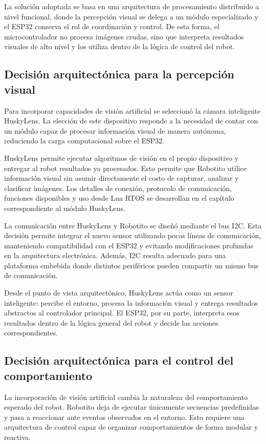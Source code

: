 \documentclass{prgrado}
\begin{document}
La solución adoptada se basa en una arquitectura de procesamiento distribuido a nivel funcional, donde la percepción visual se delega a un módulo especializado y el ESP32 conserva el rol de coordinación y control. De esta forma, el microcontrolador no procesa imágenes crudas, sino que interpreta resultados visuales de alto nivel y los utiliza dentro de la lógica de control del robot.

\subsection{Decisión arquitectónica para la percepción visual}

Para incorporar capacidades de visión artificial se seleccionó la cámara inteligente HuskyLens. La elección de este dispositivo responde a la necesidad de contar con un módulo capaz de procesar información visual de manera autónoma, reduciendo la carga computacional sobre el ESP32.

HuskyLens permite ejecutar algoritmos de visión en el propio dispositivo y entregar al robot resultados ya procesados. Esto permite que Robotito utilice información visual sin asumir directamente el costo de capturar, analizar y clasificar imágenes. Los detalles de conexión, protocolo de comunicación, funciones disponibles y uso desde Lua RTOS se desarrollan en el capítulo correspondiente al módulo HuskyLens.

La comunicación entre HuskyLens y Robotito se diseñó mediante el bus I2C. Esta decisión permite integrar el nuevo sensor utilizando pocas líneas de comunicación, manteniendo compatibilidad con el ESP32 y evitando modificaciones profundas en la arquitectura electrónica. Además, I2C resulta adecuado para una plataforma embebida donde distintos periféricos pueden compartir un mismo bus de comunicación.

Desde el punto de vista arquitectónico, HuskyLens actúa como un sensor inteligente: percibe el entorno, procesa la información visual y entrega resultados abstractos al controlador principal. El ESP32, por su parte, interpreta esos resultados dentro de la lógica general del robot y decide las acciones correspondientes.

\subsection{Decisión arquitectónica para el control del comportamiento}

La incorporación de visión artificial cambia la naturaleza del comportamiento esperado del robot. Robotito deja de ejecutar únicamente secuencias predefinidas y pasa a reaccionar ante eventos observados en el entorno. Esto requiere una arquitectura de control capaz de organizar comportamientos de forma modular y reactiva.
\end{document}

